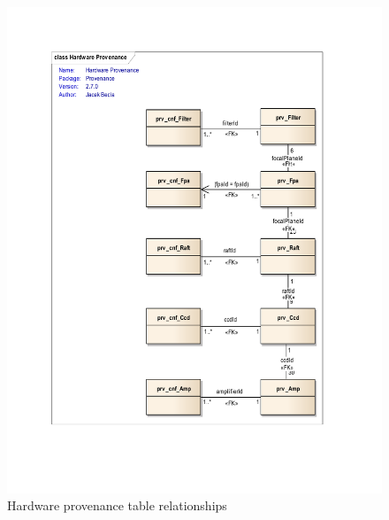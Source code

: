 \documentclass[DM,lsstdraft,toc]{lsstdoc}
\begin{document}
\begin{figure}
  \centering\includegraphics[scale=0.70]{diagrams/hardware_provenance}
  \caption{Hardware provenance table relationships}
\end{figure}
\end{document}
